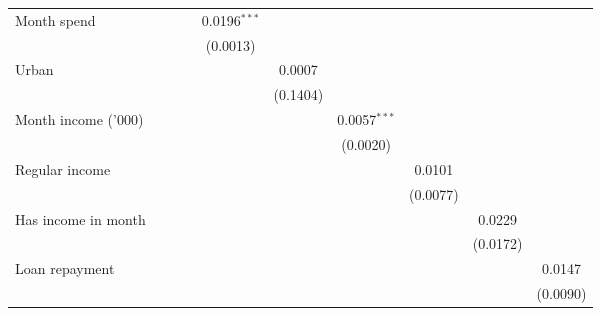 \begin{table}[htbp]
\begin{footnotesize}
\begin{tabular}{lccccccccc}
         Month spend                 &                 &                 &                 & 0.0196$^{***}$  &                 &                 &                 &                 &   \\
                                     &                 &                 &                 & (0.0013)        &                 &                 &                 &                 &   \\
         Urban                       &                 &                 &                 &                 & 0.0007          &                 &                 &                 &   \\
                                     &                 &                 &                 &                 & (0.1404)        &                 &                 &                 &   \\
         Month income ('000)         &                 &                 &                 &                 &                 & 0.0057$^{***}$  &                 &                 &   \\
                                     &                 &                 &                 &                 &                 & (0.0020)        &                 &                 &   \\
         Regular income              &                 &                 &                 &                 &                 &                 & 0.0101          &                 &   \\
                                     &                 &                 &                 &                 &                 &                 & (0.0077)        &                 &   \\
         Has income in month         &                 &                 &                 &                 &                 &                 &                 & 0.0229          &   \\
                                     &                 &                 &                 &                 &                 &                 &                 & (0.0172)        &   \\
         Loan repayment              &                 &                 &                 &                 &                 &                 &                 &                 & 0.0147\\
                                     &                 &                 &                 &                 &                 &                 &                 &                 & (0.0090)\\

\end{tabular}
\end{footnotesize}
\end{table}
